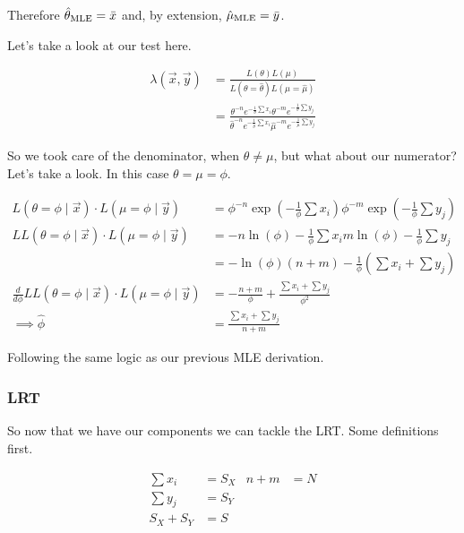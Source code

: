 Therefore $\hat{\theta}_{\text{MLE}} = \bar{x}$ and, by extension, $\hat{\mu}_{\text{MLE}} = \bar{y}$.

Let's take a look at our test here.

\begin{align*}
	\lambda(\vec{x}, \vec{y}) &= \frac{L(\theta)L(\mu)}{L(\theta = \hat{\theta})L(\mu = \hat{\mu})} \\
	&= \frac
	{\theta^{-n} e^{-\frac{1}{\theta} \sum x_i} \theta^{-m} e^{-\frac{1}{\theta} \sum y_j}}
	{\hat{\theta}^{-n} e^{-\frac{1}{\hat{\theta}} \sum x_i} \hat{\mu}^{-m} e^{-\frac{1}{\hat{\mu}} \sum y_j}}
\end{align*}

So we took care of the denominator, when $\theta \neq \mu$, but what about our numerator? Let's take a look. In this case $\theta = \mu = \phi$. 

\begin{align*}
	L(\theta = \phi \mid \vec{x}) \cdot L(\mu = \phi \mid \vec{y}) &= \phi^{-n}\exp\left( -\frac{1}{\phi} \sum x_i \right) \phi^{-m}\exp\left( -\frac{1}{\phi} \sum y_j \right) \\
	LL(\theta = \phi \mid \vec{x}) \cdot L(\mu = \phi \mid \vec{y}) &= -n\ln(\phi) - \frac{1}{\phi} \sum x_i  m\ln(\phi) - \frac{1}{\phi} \sum y_j \\
	&= -\ln(\phi)(n+m) - \frac{1}{\phi}\left( \sum x_i + \sum y_j \right) \\
	\frac{d}{d\phi}	LL(\theta = \phi \mid \vec{x}) \cdot L(\mu = \phi \mid \vec{y}) &= -\frac{n+m}{\phi} + \frac{\sum x_i + \sum y_j}{\phi^2} \\
	\implies \hat{\phi} &= \frac{\sum x_i + \sum y_j}{n + m}
\end{align*}

Following the same logic as our previous MLE derivation.

\pagebreak
\subsubsection{LRT}

So now that we have our components we can tackle the LRT. Some definitions first.

\vspace{-5mm}
\begin{align*}
	\sum x_i &= S_X & n+m &= N \\
	\sum y_j &= S_Y \\
	S_X + S_Y &= S \\
\end{align*}
\vspace{-5mm}

